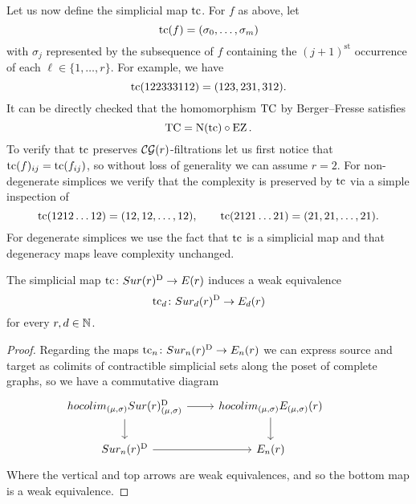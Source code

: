 Let us now define the simplicial map $\operatorname{tc}$.
For $f$ as above, let
\[
\operatorname{tc}(f) = (\sigma_0,\dots,\sigma_m)
\]
with $\sigma_j$ represented by the subsequence of $f$ containing the $(j+1)^{\mathrm{st}}$ occurrence of each $\ell \in \{1,\dots,r\}$.
For example, we have
\[
\operatorname{tc}(122333112) = (123,231,312).
\]
It can be directly checked that the homomorphism $\operatorname{TC}$ by Berger--Fresse satisfies
\[
\operatorname{TC} = \operatorname{N}(\operatorname{tc}) \circ \operatorname{EZ}.
\]
To verify that $\operatorname{tc}$ preserves $\mathcal{CG}(r)$-filtrations let us first notice that $\operatorname{tc}(f)_{ij} = \operatorname{tc}(f_{ij})$, so without loss of generality we can assume $r=2$.
For non-degenerate simplices we verify that the complexity is preserved by $\operatorname{tc}$ via a simple inspection of
\[
\operatorname{tc}(1212\dots12) = (12,12,\dots,12),
\qquad
\operatorname{tc}(2121\dots21) = (21,21,\dots,21).
\]
For degenerate simplices we use the fact that $\operatorname{tc}$ is a simplicial map and that degeneracy maps leave complexity unchanged.

\begin{theorem}
	The simplicial map $\operatorname{tc} \colon Sur(r)^{\mathrm{D}} \to E(r)$ induces a weak equivalence
	\[
	\operatorname{tc}_d \colon Sur_d(r)^{\mathrm{D}} \to E_d(r)
	\]
	for every $r,d \in \mathbb{N}$.
\end{theorem}


\begin{proof}
	Regarding the maps $\operatorname{tc}_{n} \colon Sur_{n}(r)^{\mathrm{D}} \to E_{n}(r)$ we can express source and target as colimits of contractible %
	simplicial sets along the poset of complete graphs,
	so we have a commutative diagram
	\begin{equation*}
		\begin{tikzcd}
			hocolim_{(\mu,\sigma)}\sur(r)_{(\mu,\sigma)}^\diag \arrow[r] \arrow[d] & hocolim_{(\mu,\sigma)}\BE_{(\mu,\sigma)}(r) \arrow[d] \\
			\sur_{n}(r)^\diag\arrow[r] & \BE_{n}(r) &
		\end{tikzcd}
	\end{equation*}
	Where the vertical and top arrows
	are weak equivalences, and so the bottom map is a weak equivalence.
\end{proof}